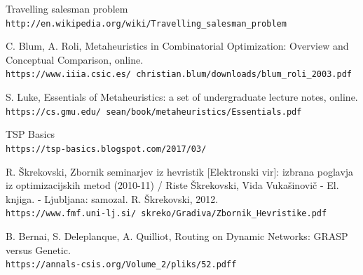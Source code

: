 \documentclass[12pt,a4paper]{amsart}
\theoremstyle{definition} %
\theoremstyle{plain} %
\begin{document}
\pagebreak
\begin{thebibliography}{99}

Travelling salesman problem
\\\texttt{http://en.wikipedia.org/wiki/Travelling\_salesman\_problem}

\bibitem{}
C. Blum, A. Roli, Metaheuristics in Combinatorial Optimization: Overview and Conceptual Comparison, online.
\\\texttt{https://www.iiia.csic.es/~christian.blum/downloads/blum\_roli\_2003.pdf}

\bibitem{}
S. Luke, Essentials of Metaheuristics: a set of undergraduate lecture notes, online.
\\\texttt{https://cs.gmu.edu/~sean/book/metaheuristics/Essentials.pdf}

\bibitem{}
TSP Basics
\\\texttt{https://tsp-basics.blogspot.com/2017/03/}

\bibitem{}
R. Škrekovski, Zbornik seminarjev iz hevristik [Elektronski vir]: izbrana poglavja iz optimizacijskih metod (2010-11) / Riste Škrekovski, Vida Vukašinovič - El. knjiga. - Ljubljana: samozal. R. Škrekovski, 2012. 
\\\texttt{https://www.fmf.uni-lj.si/~skreko/Gradiva/Zbornik\_Hevristike.pdf}

\bibitem{}
B. Bernai, S. Deleplanque, A. Quilliot, Routing on Dynamic Networks: GRASP versus Genetic.
\\\texttt{https://annals-csis.org/Volume\_2/pliks/52.pdff}

\end{thebibliography}

\thispagestyle{empty}
\listoffigures
\listoftables
\pagebreak
\end{document}
